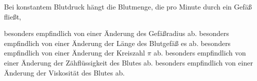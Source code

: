 \documentclass[11pt]{exam}
\begin{document}
\begin{questions}
\vspace{3mm}\question Bei konstantem Blutdruck hängt die Blutmenge, die pro Minute durch ein Gefäß fließt,

\begin{choices}
	\choice besonders empfindlich von einer Änderung des Gefäßradius ab.
	\choice besonders empfindlich von einer Änderung der Länge des Blutgefäß es ab.
	\choice besonders empfindlich von einer Änderung der Kreiszahl \(\pi\) ab.
	\choice besonders empfindlich von einer Änderung der Zähflüssigkeit des Blutes ab.
	\choice besonders empfindlich von einer Änderung der Viskosität des Blutes ab.
\end{choices}

\vspace{3mm}\end{questions}
\end{document}
